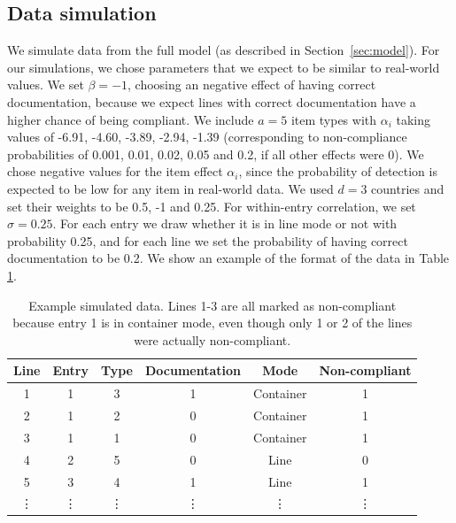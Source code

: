 \documentclass[useAMS,usenatbib,referee]{biom}
\begin{document}
\subsection{Data simulation}
We simulate data from the full model (as described in Section~\ref{sec:model}). For our simulations, we chose parameters that we expect to be similar to real-world values. We set \(\beta=-1\), choosing an negative effect of having correct documentation, because we expect lines with correct documentation have a higher chance of being compliant. We include $a=5$ item types with \(\alpha_i\) taking values of -6.91, -4.60, -3.89, -2.94, -1.39 (corresponding to non-compliance probabilities of 0.001, 0.01, 0.02, 0.05 and 0.2, if all other effects were 0). We chose negative values for the item effect $\alpha_i$, since the probability of detection is expected to be low for any item in real-world data. We used $d=3$ countries and set their weights to be 0.5, -1 and 0.25.
For within-entry correlation, we set \(\sigma = 0.25\). For each entry we draw whether it is in line mode or not with probability 0.25, and for each line we set the probability of having correct documentation to be 0.2. We show an example of the format of the data in Table \ref{table:example_data}.

\vspace{0.1cm}
\begin{table}[h]
\caption{Example simulated data. Lines 1-3 are all marked as non-compliant because entry 1 is in container mode, even though only 1 or 2 of the lines were actually non-compliant.}
\label{table:example_data}
\begin{center}

\begin{tabular}{|c|c|c|c|c|c|}
\hline 
Line & Entry & Type & Documentation & Mode & Non-compliant \\ 
\hline 
1 & 1 & 3 & 1  & Container & 1 \\ 
\hline 
2 & 1 & 2 & 0  & Container & 1 \\ 
\hline 
3 & 1 & 1 & 0 & Container & 1 \\ 
\hline 
4 & 2 & 5 & 0 &Line & 0 \\ 
\hline 
5 & 3 & 4 & 1 &Line & 1 \\ 
\hline 
\vdots & \vdots & \vdots & \vdots & \vdots & \vdots \\ 
\hline 
\end{tabular} 

\end{center}
\end{table}
\end{document}
